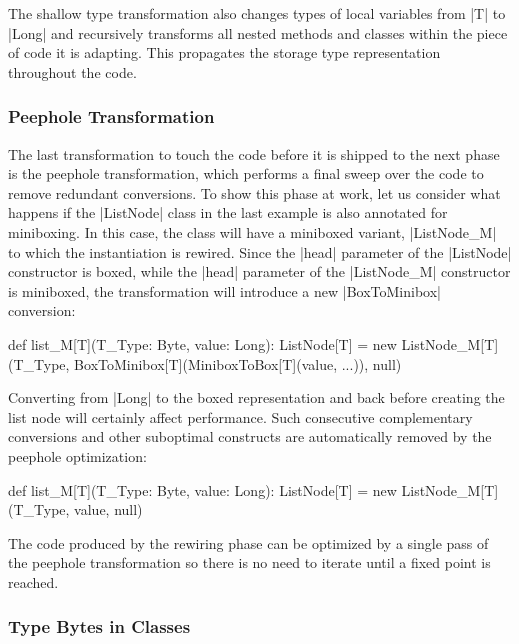 The shallow type transformation also changes types of local variables from |T| to |Long| and recursively transforms all nested methods and classes within the piece of code it is adapting. This propagates the storage type representation throughout the code.

\subsubsection*{Peephole Transformation}
\label{mbox:sec-mb-traf-peephole}

The last transformation to touch the code before it is shipped to the next phase is the peephole transformation, which performs a final sweep over the code to remove redundant conversions. To show this phase at work, let us consider what happens if the |ListNode| class in the last example is also annotated for miniboxing. In this case, the class will have a miniboxed variant, |ListNode_M| to which the instantiation is rewired. Since the |head| parameter of the |ListNode| constructor is boxed, while the |head| parameter of the |ListNode_M| constructor is miniboxed, the transformation will introduce a new |BoxToMinibox| conversion:

\begin{lstlisting-nobreak}
 def list_M[T](T_Type: Byte, value: Long): ListNode[T] =
   new ListNode_M[T](T_Type, BoxToMinibox[T](MiniboxToBox[T](value, ...)), null)
\end{lstlisting-nobreak}

Converting from |Long| to the boxed representation and back before creating the list node will certainly affect performance. Such consecutive complementary conversions and other suboptimal constructs are automatically removed by the peephole optimization: %

\begin{lstlisting-nobreak}
 def list_M[T](T_Type: Byte, value: Long): ListNode[T] =
   new ListNode_M[T](T_Type, value, null)
\end{lstlisting-nobreak}

The code produced by the rewiring phase can be optimized by a single pass of the peephole transformation so there is no need to iterate until a fixed point is reached.

\subsubsection*{Type Bytes in Classes}
\label{mbox:sec-mb-traf-classes}

